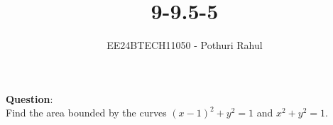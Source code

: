 \documentclass[journal]{IEEEtran}
\begin{document}

\vspace{3cm}

\title{9-9.5-5}
\author{EE24BTECH11050 - Pothuri Rahul}
{\let\newpage\relax\maketitle}

\renewcommand{\thefigure}{\theenumi}
\renewcommand{\thetable}{\theenumi}
\setlength{\intextsep}{10pt} %


\renewcommand{\thetable}{\theenumi}
\textbf{Question}:\\
Find the area bounded by the curves $(x-1)^2 + y^2 = 1$ and $x^2 + y^2 = 1$.  \\
\solution 
\end{document}
